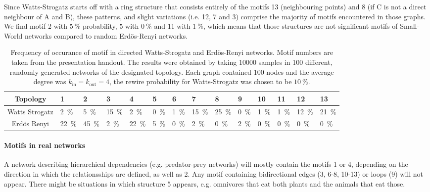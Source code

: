\documentclass{scrartcl}
\begin{document}
Since Watts-Strogatz starts off with a ring structure that consists entirely of the motifs 13 (neighbouring points) and 8 (if C is not a direct neighbour of A and B), these patterns, and slight variations (i.e. 12, 7 and 3) comprise the majority of motifs encountered in those graphs. We find motif 2 with $\SI{5}{\percent}$ probability, $5$ with $\SI{0}{\percent}$ and 11 with $\SI{1}{\percent}$, which means that those structures are not significant motifs of Small-World networks compared to random Erdös-Renyi networks.

\begin{table}
	\centering
		\begin{tabular}{c|*{13}{l}}
		\toprule
		Topology & \num{1} & 2 & 3 & 4 & 5 &6 & 7 & 8 & 9 & 10 &11 & 12& 13  \\ \midrule
		Watts Strogatz & \SI{2}{\percent} & \SI{5}{\percent} & \SI{15}{\percent} & \SI{2}{\percent} & \SI{0}{\percent} & \SI{1}{\percent} & \SI{15}{\percent} & \SI{25}{\percent} & \SI{0}{\percent} & \SI{1}{\percent} & \SI{1}{\percent} & \SI{12}{\percent} & \SI{21}{\percent} \\
		Erdös Renyi & \SI{22}{\percent} & \SI{45}{\percent} & \SI{2}{\percent} & \SI{22}{\percent} & \SI{5}{\percent} & \SI{0}{\percent} & \SI{2}{\percent} & \SI{0}{\percent} & \SI{2}{\percent} & \SI{0}{\percent} & \SI{0}{\percent} & \SI{0}{\percent} & \SI{0}{\percent}\\
		\bottomrule
		\end{tabular}
	\caption{Frequency of occurance of motif in directed Watts-Strogatz and Erdös-Renyi networks. Motif numbers are taken from the presentation handout. The results were obtained by taking 10000 samples in 100 different, randomly generated networks of the designated topology. Each graph contained 100 nodes and the average degree was $k_{\mathrm{in}} = k_{\mathrm{out}}=4$, the rewire probability for Watts-Strogatz was chosen to be $\SI{10}{\percent}$.}
	\label{tab:motifs}
\end{table}

\paragraph{Motifs in real networks}
A network describing hierarchical dependencies (e.g. predator-prey networks) will mostly contain the motifs 1 or 4, depending on the direction in which the relationsships are defined, as well as 2. Any motif containing bidirectional edges (3, 6-8, 10-13) or loops (9) will not appear. There might be situations in which structure 5 appears, e.g. omnivores that eat both plants and the animals that eat those.
\end{document}
